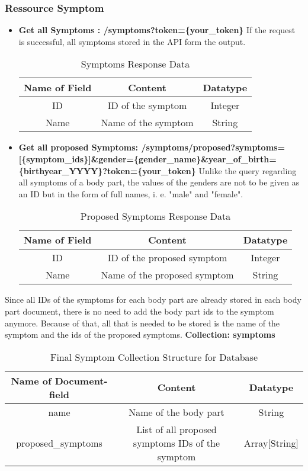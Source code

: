 \subsubsection{Ressource Symptom}
\begin{itemize}
	\item \textbf{Get all Symptoms :  /symptoms?token=\{your\_token\}}
	\newline		
	If the request is successful, all symptoms stored in the API form the output.
	\begin{table}[H]
		\centering
		\begin{tabular}{ | c| c| c | } 
			\hline
			Name of Field& Content & Datatype \\ 
			\hline
			ID & ID of the symptom & Integer \\ 
			\hline
			Name & Name of the symptom & String \\ 
			\hline
		\end{tabular}
	\caption{Symptoms Response Data}
	\end{table}
	
	\item \textbf{Get all proposed Symptoms:  /symptoms/proposed?symptoms=[\{symptom\_ids\}]\newline\&gender=\{gender\_name\}\&year\_of\_birth=\{birthyear\_YYYY\}?token=\{your\_token\}}
	\newline
	Unlike the query regarding all symptoms of a body part, the values of the genders are not to be given as an ID but in the form of full names, i. e. "male" and "female".
	\begin{table}[H]
		\centering
		\begin{tabular}{ | c| c| c | } 
			\hline
			Name of Field& Content & Datatype \\ 
			\hline
			ID & ID of the proposed symptom & Integer \\ 
			\hline
			Name & Name of the proposed symptom & String \\ 
			\hline
		\end{tabular}
	\caption{Proposed Symptoms Response Data}
	\end{table}
\end{itemize}
\noindent
Since all IDs of the symptoms for each body part are already stored in each body part document, there is no need to add the body part ids to the symptom anymore. Because of that, all that is needed to be stored is the name of the symptom and the ids of the proposed symptoms.
\newline
\textbf{Collection: symptoms}
\begin{table}[H]
	\centering
	\begin{tabular}{ | c| c| c | } 
		\hline
		Name of Document-field& Content & Datatype \\ 
		\hline
		name & Name of the body part & String \\ 
		\hline
		proposed\_symptoms & List of all proposed symptoms IDs of the symptom  & Array[String] \\ 
		\hline
	\end{tabular}
	 \caption{Final Symptom Collection Structure for Database}
\end{table}

